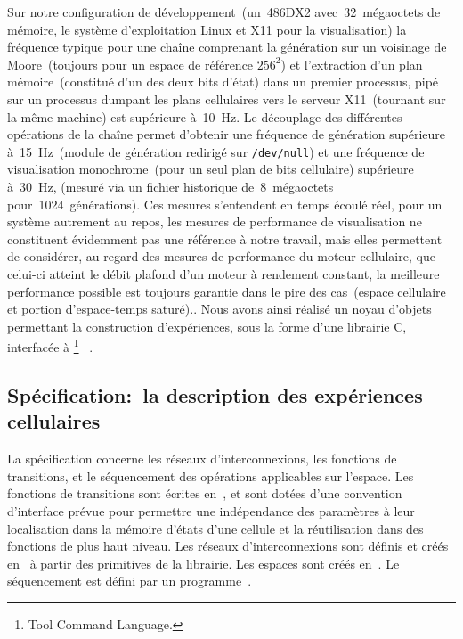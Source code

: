 {  Sur notre configuration de d\'eveloppement~(un~486DX2 avec~32~m\'egaoctets
  de m\'emoire, le syst\`eme d'exploitation Linux et X11 pour la
  visualisation) la fr\'equence typique pour une cha\^ine comprenant la
  g\'en\'eration sur un voisinage de Moore~(toujours pour un espace de
  r\'ef\'erence $256^2$) et l'extraction d'un plan m\'emoire~(constitu\'e d'un
  des deux bits d'\'etat) dans un premier processus, pip\'e sur un processus
  dumpant les plans cellulaires vers le serveur X11~(tournant sur la
  m\^eme machine) est sup\'erieure \`a~10~Hz. %
  Le d\'ecouplage des diff\'erentes op\'erations de la cha\^ine permet
  d'obtenir une fr\'equence de g\'en\'eration sup\'erieure \`a~15~Hz~(module de
  g\'en\'eration redirig\'e sur \texttt{/dev/null}) et une fr\'equence de
  visualisation monochrome~(pour un seul plan de bits cellulaire)
  sup\'erieure \`a~30~Hz, (mesur\'e via un fichier historique
  de~8~m\'egaoctets pour~1024~g\'en\'erations). %
  Ces mesures s'entendent en temps \'ecoul\'e r\'eel, pour un syst\`eme
  autrement au repos, les mesures de performance de visualisation ne
  constituent \'evidemment pas une r\'ef\'erence \`a notre travail, mais elles
  permettent de consid\'erer, au regard des mesures de performance du
  moteur cellulaire, que celui-ci atteint le d\'ebit plafond d'un moteur
  \`a rendement constant, \ie la meilleure performance possible est
  toujours garantie dans le pire des
  cas~(espace cellulaire et portion d'espace-temps satur\'e).}. %
Nous avons ainsi r\'ealis\'e un noyau d'objets permettant la construction
d'exp\'eriences, sous la forme d'une librairie C, interfac\'ee \`a
\footnote{%
  Tool Command Language.}%
~\cite[]{Ousterhout90,Ousterhout91}. %

\subsection*{Sp\'ecification:~la description des exp\'eriences cellulaires}

La sp\'ecification concerne les r\'eseaux d'interconnexions, les fonc\-tions
de transitions, et le s\'equencement des op\'erations applicables sur
l'espace. %
Les fonc\-tions de transitions sont \'ecrites en~, et sont dot\'ees
d'une convention d'interface pr\'evue pour permettre une ind\'ependance
des param\`etres \`a leur localisation dans la m\'emoire d'\'etats d'une
cellule et la r\'eutilisation dans des fonctions de plus haut niveau. %
Les r\'eseaux d'interconnexions sont d\'efinis et cr\'e\'es en~ \`a
partir des primitives de la librairie. %
Les espaces sont cr\'e\'es en~. %
Le s\'equencement est d\'efini par un programme~. %

